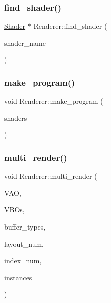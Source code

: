 \subsubsection{\texorpdfstring{find\+\_\+shader()}{find\_shader()}}
{\footnotesize\ttfamily \mbox{\hyperlink{classShader}{Shader}} $\ast$ Renderer\+::find\+\_\+shader (\begin{DoxyParamCaption}\item[{string}]{shader\+\_\+name }\end{DoxyParamCaption})}

\mbox{\label{classRenderer_a25a35d48716bd7c096f90cc5eabc2fc6}} 
\subsubsection{\texorpdfstring{make\+\_\+program()}{make\_program()}}
{\footnotesize\ttfamily void Renderer\+::make\+\_\+program (\begin{DoxyParamCaption}\item[{vector$<$ uint $>$ $\ast$}]{shaders }\end{DoxyParamCaption})}

\mbox{\label{classRenderer_aa0941d2b58991dabe9231ee2c657c36f}} 
\subsubsection{\texorpdfstring{multi\+\_\+render()}{multi\_render()}}
{\footnotesize\ttfamily void Renderer\+::multi\+\_\+render (\begin{DoxyParamCaption}\item[{G\+Luint}]{V\+AO,  }\item[{vector$<$ G\+Luint $>$ $\ast$}]{V\+B\+Os,  }\item[{vector$<$ G\+Luint $>$ $\ast$}]{buffer\+\_\+types,  }\item[{G\+Luint}]{layout\+\_\+num,  }\item[{G\+Luint}]{index\+\_\+num,  }\item[{G\+Luint}]{instances }\end{DoxyParamCaption})}

\mbox{\label{classRenderer_af7e5f8f68742f198e315fb4683a605a4}} 
